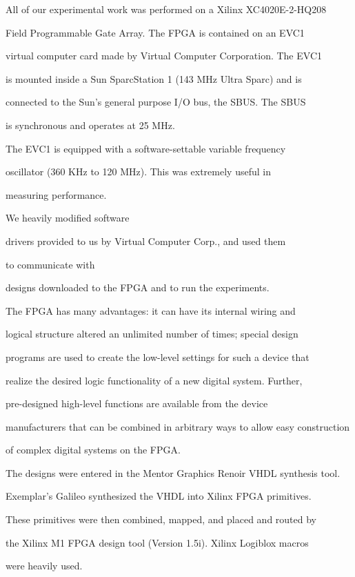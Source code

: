 \documentclass[12pt,dvips]{article}
\begin{document}
\label{method}

All of our experimental work was performed on a Xilinx XC4020E-2-HQ208

Field Programmable Gate Array. The FPGA is contained on an EVC1

virtual computer card made by Virtual Computer Corporation. The EVC1

is mounted inside a Sun SparcStation 1 (143 MHz Ultra Sparc) and is

connected to the Sun's general purpose I/O bus, the SBUS. The SBUS

is synchronous and operates at 25 MHz.

The EVC1 is equipped with a software-settable variable frequency

oscillator (360 KHz to 120 MHz). This was extremely useful in

measuring performance.

We heavily modified software

drivers provided to us by Virtual Computer Corp., and used them

to communicate with

designs downloaded to the FPGA and to run the experiments.



The FPGA has many advantages: it can have its internal wiring and

logical structure altered an unlimited number of times; special design

programs are used to create the low-level settings for such a device that

realize the desired logic functionality of a new digital system. Further,

pre-designed high-level functions are available from the device

manufacturers that can be combined in arbitrary ways to allow easy construction

of complex digital systems on the FPGA.



The designs were entered in the Mentor Graphics Renoir VHDL synthesis tool.

Exemplar's Galileo synthesized the VHDL into Xilinx FPGA primitives.

These primitives were then combined, mapped, and placed and routed by

the Xilinx M1 FPGA design tool (Version 1.5i). Xilinx Logiblox macros

were heavily used.
\end{document}
